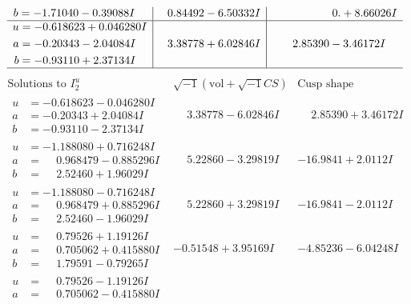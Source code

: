 \documentclass[1p]{elsarticle_modified}
\theoremstyle{definition}
\newcommand{\I}{\sqrt{-1}}
\begin{document}
$$\begin{array}{c|c|c}
\begin{aligned}
b &= -1.71040 - 0.39088 I\end{aligned}
 & \phantom{-}0.84492 - 6.50332 I & \phantom{-0.000000 -}0. + 8.66026 I \\ \hline\begin{aligned}
u &= -0.618623 + 0.046280 I \\
a &= -0.20343 - 2.04084 I \\
b &= -0.93110 + 2.37134 I\end{aligned}
 & \phantom{-}3.38778 + 6.02846 I & \phantom{-}2.85390 - 3.46172 I\\
 \hline 
 \end{array}$$\newpage$$\begin{array}{c|c|c}  
\text{Solutions to }I^u_{2}& \I (\text{vol} + \sqrt{-1}CS) & \text{Cusp shape}\\
 \hline 
\begin{aligned}
u &= -0.618623 - 0.046280 I \\
a &= -0.20343 + 2.04084 I \\
b &= -0.93110 - 2.37134 I\end{aligned}
 & \phantom{-}3.38778 - 6.02846 I & \phantom{-}2.85390 + 3.46172 I \\ \hline\begin{aligned}
u &= -1.188080 + 0.716248 I \\
a &= \phantom{-}0.968479 - 0.885296 I \\
b &= \phantom{-}2.52460 + 1.96029 I\end{aligned}
 & \phantom{-}5.22860 - 3.29819 I & -16.9841 + 2.0112 I \\ \hline\begin{aligned}
u &= -1.188080 - 0.716248 I \\
a &= \phantom{-}0.968479 + 0.885296 I \\
b &= \phantom{-}2.52460 - 1.96029 I\end{aligned}
 & \phantom{-}5.22860 + 3.29819 I & -16.9841 - 2.0112 I \\ \hline\begin{aligned}
u &= \phantom{-}0.79526 + 1.19126 I \\
a &= \phantom{-}0.705062 + 0.415880 I \\
b &= \phantom{-}1.79591 - 0.79265 I\end{aligned}
 & -0.51548 + 3.95169 I & -4.85236 - 6.04248 I \\ \hline\begin{aligned}
u &= \phantom{-}0.79526 - 1.19126 I \\
a &= \phantom{-}0.705062 - 0.415880 I \\

\end{aligned}
\end{array}$$
\end{document}
